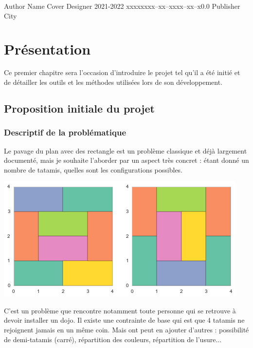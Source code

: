 \documentclass{tstextbook}
\begin{document}
       {Author Name}
       {Cover Designer}
       {2021-2022}
       {xxxxx}{xxx--xx--xxxx--xx--x}{0.0}
       {Publisher}
       {City}


\chapter{Présentation}

\begin{summary}
  Ce premier chapitre sera l'occasion d'introduire le projet tel qu'il a été initié et de 
  détailler les outils et les méthodes utilisées lors de son développement.
\end{summary}

\section{Proposition initiale du projet}

  \subsection{Descriptif de la problématique}


    Le pavage du plan avec des rectangle est un problème classique et déjà largement documenté,
    mais je souhaite l'aborder par un aspect très concret : étant donné un nombre de tatamis, quelles sont les 
    configurations possibles.\\
    \begin{center}
        \includegraphics[width = 0.5\linewidth]{images/pavage-par-tatamis.png}
    \end{center}
    C'est un problème que rencontre notamment toute personne qui se retrouve à devoir installer un dojo.
    Il existe une contrainte de base qui est que 4 tatamis ne rejoignent jamais en un même coin. Mais ont peut
    en ajouter d'autres : possibilité de demi-tatamis (carré), répartition des couleurs, répartition de l'usure...
\end{document}
